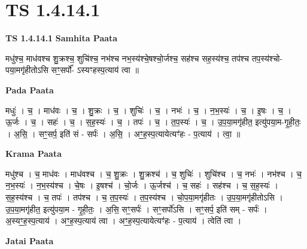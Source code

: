 \documentclass[17pt]{extarticle}
\begin{document}
\section{ TS 1.4.14.1 }

\textbf{TS 1.4.14.1 } \newline
\textbf{Samhita Paata} \newline

मधु॑श्च॒ माध॑वश्च शु॒क्रश्च॒ शुचि॑श्च॒ नभ॑श्च नभ॒स्य॑श्चे॒षश्चो॒र्जश्च॒ सह॑श्च सह॒स्य॑श्च॒ तप॑श्च तप॒स्य॑श्चो-पया॒मगृ॑हीतोऽसि सꣳ॒॒सर्पो᳚- ऽस्यꣳहस्प॒त्याय॑ त्वा ॥ \newline

\textbf{Pada Paata} \newline

मधुः॑ । च॒ । माध॑वः । च॒ । शु॒क्रः । च॒ । शुचिः॑ । च॒ । नभः॑ । च॒ । न॒भ॒स्यः॑ । च॒ । इ॒षः । च॒ । ऊ॒र्जः । च॒ । सहः॑ । च॒ । स॒ह॒स्यः॑ । च॒ । तपः॑ । च॒ । त॒प॒स्यः॑ । च॒ । उ॒प॒या॒मगृ॑हीत॒ इत्यु॑पया॒म-गृ॒ही॒तः॒ । अ॒सि॒ । सꣳ॒॒सर्प॒ इति॑ सं - सर्पः॑ । अ॒सि॒ । अꣳ॒॒ह॒स्प॒त्यायेत्यꣳ॑हः - प॒त्याय॑ । त्वा॒ ॥  \newline


\textbf{Krama Paata} \newline

मधु॑श्च । च॒ माध॑वः । माध॑वश्च । च॒ शु॒क्रः । शु॒क्रश्च॑ । च॒ शुचिः॑ । शुचि॑श्च । च॒ नभः॑ । नभ॑श्च । च॒ न॒भ॒स्यः॑ । न॒भ॒स्य॑श्च । चे॒षः । इ॒षश्च॑ । चो॒र्जः । ऊ॒र्जश्च॑ । च॒ सहः॑ । सह॑श्च । च॒ स॒ह॒स्यः॑ । स॒ह॒स्य॑श्च । च॒ तपः॑ । तप॑श्च । च॒ त॒प॒स्यः॑ । त॒प॒स्य॑श्च । चो॒प॒या॒मगृ॑हीतः । उ॒प॒या॒मगृ॑हीतोऽसि । उ॒प॒या॒मगृ॑हीत॒ इत्यु॑पया॒म - गृ॒ही॒तः॒ । अ॒सि॒ सꣳ॒॒सर्पः॑ । सꣳ॒॒सर्पो॑ऽसि । सꣳ॒॒सर्प॒ इति॑ सम् - सर्पः॑ । अ॒स्यꣳ॒॒ह॒स्प॒त्याय॑ । अꣳ॒॒ह॒स्प॒त्याय॑ त्वा । अꣳ॒॒ह॒स्प॒त्यायेत्यꣳ॑हः - प॒त्याय॑ । त्वेति॑ त्वा । \newline

\textbf{Jatai Paata} \newline
\end{document}
